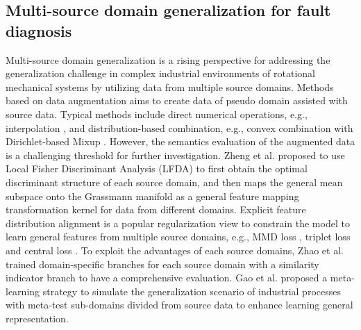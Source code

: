 \documentclass{article}
\begin{document}
	\subsection{Multi-source domain generalization for fault diagnosis}
	Multi-source domain generalization is a rising perspective for addressing the generalization challenge in complex industrial environments of rotational mechanical systems by utilizing data from multiple source domains. Methods based on data augmentation aims to create data of pseudo domain assisted with source data. Typical methods include direct numerical operations, e.g., interpolation \cite{LI2020409}, and distribution-based combination, e.g., convex combination with Dirichlet-based Mixup \cite{LI2023109171}. However, the semantics evaluation of the augmented data is a challenging threshold for further investigation. Zheng et al. \cite{8643085} proposed to use Local Fisher Discriminant Analysis (LFDA) to first obtain the optimal discriminant structure of each source domain, and then maps the general mean subspace onto the Grassmann manifold as a general feature mapping transformation kernel for data from different domains. Explicit feature distribution alignment is a popular regularization view to constrain the model to learn general features from multiple source domains, e.g., MMD loss \cite{HU2022104896}, triplet loss \cite{9452118} and central loss \cite{10121353}. To exploit the advantages of each source domains, Zhao et al. \cite{RN10} trained domain-specific branches for each source domain with a similarity indicator branch to have a comprehensive evaluation. Gao et al. \cite{GAO2024111506} proposed a meta-learning strategy to simulate the generalization scenario of industrial processes with meta-test sub-domains divided from source data to enhance learning general representation.
	
\end{document}
